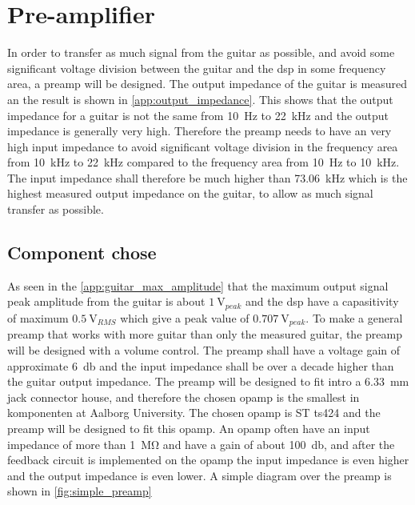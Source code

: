 \section{Pre-amplifier}
In order to transfer as much signal from the guitar as possible, and avoid some significant voltage division between the guitar and the \gls{dsp} in some frequency area, a \gls{preamp} will be designed. The output impedance of the guitar is measured an the result is shown in \autoref{app:output_impedance}. This shows that the output impedance for a guitar is not the same from \SI{10}{\hertz} to \SI{22}{\kilo\hertz} and the output impedance is generally very high. Therefore the \gls{preamp} needs to have an very high input impedance to avoid significant voltage division in the frequency area from \SI{10}{\kilo\hertz} to \SI{22}{\kilo\hertz} compared to the frequency area from \SI{10}{\hertz} to \SI{10}{\kilo\hertz}. The input impedance shall therefore be much higher than \SI{73.06}{\kilo\hertz} which is the highest measured output impedance on the guitar, to allow as much signal transfer as possible.

\subsection{Component chose}

As seen in the \autoref{app:guitar_max_amplitude} that the maximum output signal peak amplitude from the guitar is about $\SI{1}{\volt}_{peak}$ and the 
\gls{dsp} have a capasitivity of maximum $\SI{0.5}{\volt}_{RMS}$ which give a peak value of $\SI{0.707}{\volt}_{peak}$. To make a general \gls{preamp} that works with more guitar than only the measured guitar, the \gls{preamp} will be designed with a volume control. The \gls{preamp} shall have a voltage gain of approximate \SI{6}{\decibel} and the input impedance shall be over a decade higher than the guitar output impedance. The \gls{preamp} will be designed to fit intro a \SI{6.33}{\milli\meter}  jack connector house, and therefore the chosen \gls{opamp} is the smallest in komponenten at Aalborg University. The chosen \gls{opamp} is ST ts424 \citep{TS464} and the \gls{preamp} will be designed to fit this \gls{opamp}. 
	An \gls{opamp} often have an input impedance of more than \SI{1}{\mega\ohm} and have a gain of about \SI{100}{\decibel}, and after the feedback circuit is implemented on the \gls{opamp} the input impedance is even higher and the output impedance is even lower. A simple diagram over the \gls{preamp} is shown in \autoref{fig:simple_preamp} 

